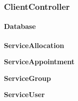 \subsubsection{ClientController}

\paragraph{Database}

\textbf{ServiceAllocation}

\textbf{ServiceAppointment}

\textbf{ServiceGroup}

\textbf{ServiceUser}

